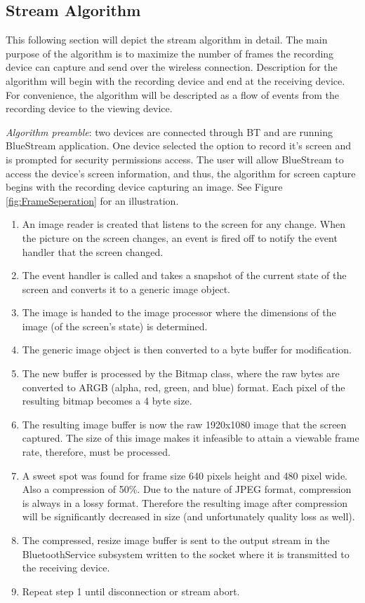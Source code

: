 \documentclass[a4paper,12pt]{article}
\begin{document}
\subsection{Stream Algorithm}
This following section will depict the stream algorithm in detail. The main purpose of the algorithm is to maximize the number of frames the recording device can capture and send over the wireless connection. Description for the algorithm will begin with the recording device and end at the receiving device. For convenience, the algorithm will be descripted as a flow of events from the recording device to the viewing device. 

\textit{Algorithm preamble}: two devices are connected through BT and are running BlueStream application. One device selected the option to record it’s screen and is prompted for security permissions access. The user will allow BlueStream to access the device’s screen information, and thus, the algorithm for screen capture begins with the recording device capturing an image. See Figure \ref{fig:FrameSeperation} for an illustration.

\begin{enumerate}
\item An image reader is created that listens to the screen for any change. When the picture on the screen changes, an event is fired off to notify the event handler that the screen changed.
\item The event handler is called and takes a snapshot of the current state of the screen and converts it to a generic image object. 
\item The image is handed to the image processor where the dimensions of the image (of the screen’s state) is determined.
\item The generic image object is then converted to a byte buffer for modification.
\item The new buffer is processed by the Bitmap class, where the raw bytes are converted to ARGB (alpha, red, green, and blue) format. Each pixel of the resulting bitmap becomes a 4 byte size. 
\item The resulting image buffer is now the raw 1920x1080 image that the screen captured. The size of this image makes it infeasible to attain a viewable frame rate, therefore, must be processed. 
\item A sweet spot was found for frame size 640 pixels height and 480 pixel wide. Also a compression of 50\%. Due to the nature of JPEG format, compression is always in a lossy format. Therefore the resulting image after compression will be significantly decreased in size (and unfortunately quality loss as well).
\item The compressed, resize image buffer is sent to the output stream in the BluetoothService subsystem written to the socket where it is transmitted to the receiving device.
\item Repeat step 1 until disconnection or stream abort. 
\end{enumerate}
\end{document}
